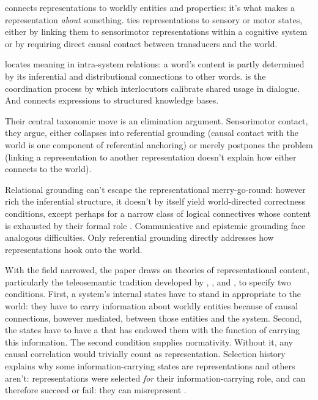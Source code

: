 \documentclass[12pt]{article}
\begin{document}
 connects representations to worldly entities and properties: it's what makes a representation \emph{about} something.  ties representations to sensory or motor states, either by linking them to sensorimotor representations within a cognitive system or by requiring direct causal contact between transducers and the world.

 locates meaning in intra-system relations: a word's content is partly determined by its inferential and distributional connections to other words.  is the coordination process by which interlocutors calibrate shared usage in dialogue. And  connects expressions to structured knowledge bases.

Their central taxonomic move is an elimination argument. Sensorimotor contact, they argue, either collapses into referential grounding (causal contact with the world is one component of referential anchoring) or merely postpones the problem (linking a representation to another representation doesn't explain how either connects to the world).

Relational grounding can't escape the representational merry-go-round: however rich the inferential structure, it doesn't by itself yield world-directed correctness conditions, except perhaps for a narrow class of logical connectives whose content is exhausted by their formal role \citep[9--10]{coelho_mollo_milliere_2026_vector_grounding_problem}. Communicative and epistemic grounding face analogous difficulties. Only referential grounding directly addresses how representations hook onto the world.

With the field narrowed, the paper draws on theories of representational content, particularly the teleosemantic tradition developed by \textcite{millikan_2017_beyond_concepts}, \textcite{neander_2017_mark_of_mental}, and \textcite{shea_2018_representation}, to specify two conditions. First, a system's internal states have to stand in appropriate  to the world: they have to carry information about worldly entities because of causal connections, however mediated, between those entities and the system. Second, the states have to have a  that has endowed them with the function of carrying this information. The second condition supplies normativity. Without it, any causal correlation would trivially count as representation. Selection history explains why some information-carrying states are representations and others aren't: representations were selected \emph{for} their information-carrying role, and can therefore succeed or fail: they can misrepresent \citep[11--12]{coelho_mollo_milliere_2026_vector_grounding_problem}.
\end{document}
